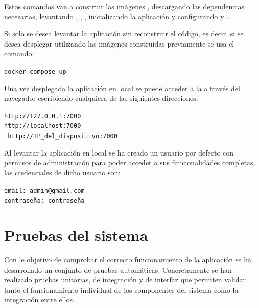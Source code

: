 Estos comandos van a construir las imágenes , descargando las dependencias necesarias, levantando , , , inicializando la aplicación  y configurando  y .

Si solo se desea levantar la aplicación sin reconstruir el código, es decir, si se desea desplegar utilizando las imágenes construidas previamente se usa el comando:
\begin{tcolorbox}[
	colback=black!3,
	colframe=black!30,
	boxrule=0.5pt,
	arc=2mm,
	title= Terminal,
	fonttitle=\bfseries,
	breakable 
]
	{\footnotesize
		\noindent
		\texttt{docker compose up}\\
	}
\end{tcolorbox}

Una vez desplegada la aplicación en local se puede acceder a la  a través del navegador  escribiendo cualquiera de las siguientes direcciones:

\begin{tcolorbox}[
	colback=cyan!5,
	colframe=cyan!50!black,
	title=navegador web,
	fonttitle=\bfseries,
	breakable
]
	{\footnotesize
		\noindent
		\texttt{http://127.0.0.1:7000}\\
		\texttt{http://localhost:7000}\\
		\texttt{	http://IP\_del\_dispositivo:7000}
	}
\end{tcolorbox}

Al levantar la aplicación en local se ha creado un usuario por defecto con permisos de administración para poder acceder a sus funcionalidades completas, las credenciales de dicho usuario son: 

\begin{tcolorbox}[
	colback=yellow!8,
	colframe=orange!60!black,
	title=Credenciales por defecto,
	fonttitle=\bfseries,
	breakable
]
	{\footnotesize
		\noindent
		\texttt{email: admin@gmail.com}\\
		\texttt{contraseña: contraseña}
	}
\end{tcolorbox}

\section{Pruebas del sistema}
\label{prog:prueb}

Con le objetivo de comprobar el correcto funcionamiento de la aplicación  se ha desarrollado un conjunto de pruebas automáticas. Concretamente se han realizado pruebas unitarias, de integración y de interfaz que permiten validar tanto el funcionamiento individual de los componentes del sistema como la integración entre ellos.

